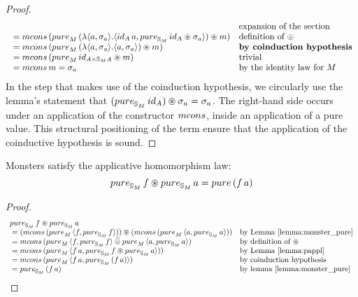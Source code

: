 \begin{proof}
$$\begin{array}{ll}
  & \mbox{expansion of the section}\\
{}= \mcons\,(\apure_M\,(\lambda \langle a,\sigma_a\rangle. \langle \id_A\,a, \apure_{\stream{M}}\,\id_A \appl \sigma_a\rangle) \appl m)
  & \mbox{definition of }\pappl\\
{}= \mcons\,(\apure_M\,(\lambda \langle a,\sigma_a\rangle. \langle a, \sigma_a\rangle) \appl m)
  & \mbox{\bf by coinduction hypothesis}\\
{}= \mcons\,(\apure_M\,\id_{A\times\stream{M}A} \appl m)
  & \mbox{trivial}\\
{}= \mcons\,m = \sigma_a
  & \mbox{by the identity law for }M
\end{array}
$$
In the step that makes use of the coinduction hypothesis, we circularly use the lemma's statement that $(\apure_{\stream{M}}\,\id_A) \appl \sigma_a = \sigma_a$.
The right-hand side occurs under an application of the constructor $\mcons$, inside an application of a pure value. 
This structural positioning of the term ensure that the application of the coinductive hypothesis is sound.

\end{proof}

\begin{lemma}
Monsters satisfy the applicative homomorphism law:
$$
\apure_{\stream{M}}\,f \appl \apure_{\stream{M}}\,a = \apure\,(f\,a)
$$
\end{lemma}
\begin{proof}
$$
\begin{array}{ll}
\apure_{\stream{M}}\,f \appl \apure_{\stream{M}}\,a\\
{}= (\mcons\,(\apure_M\,\langle f, \apure_{\stream{M}}\,f\rangle)) \appl
    (\mcons\,(\apure_M\,\langle a, \apure_{\stream{M}}\,a\rangle))
  & \mbox{by Lemma \ref{lemma:monster_pure}}\\
{}= \mcons\,(\apure_M\,\langle f, \apure_{\stream{M}}\,f\rangle \alift{\pappl}
             \apure_M\,\langle a, \apure_{\stream{M}}\,a\rangle)
  & \mbox{by definition of }\appl\\
{}= \mcons\,(\apure_M\,\langle f\, a, \apure_{\stream{M}}\,f \appl \apure_{\stream{M}}\,a \rangle))
  & \mbox{by Lemma }\ref{lemma:pappl}\\
{}= \mcons\,(\apure_M\,\langle f\,a, \apure_{\stream{M}}\,(f\,a)\rangle)
  & \mbox{by coinduction hypothesis}\\
{}= \apure_{\stream{M}}\,(f\,a)
  & \mbox{by lemma }\ref{lemma:monster_pure}
\end{array}
$$\end{proof}


